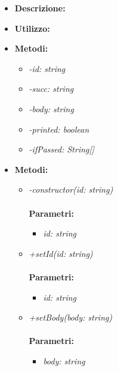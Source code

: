 \begin{itemize}
	\item \textbf{Descrizione:}\\
	
	\item \textbf{Utilizzo:}\\
	
	\item \textbf{Metodi:}
		\begin{itemize}
			\item \emph{-id: string}\\
    		
    		\item \emph{-succ: string}\\
    		
    		\item \emph{-body: string}\\
    		
    		\item \emph{-printed: boolean}\\
    		
    		\item \emph{-ifPassed: String[]}\\
    		
		\end{itemize}
	\item \textbf{Metodi:}
		\begin{itemize}
			\item \emph{-constructor(id: string)}\\
    		\\
    		\textbf{Parametri:}
    		\begin{itemize}
    			\item \emph{id: string}\\
    			
    		\end{itemize}
    		\item \emph{+setId(id: string)}\\
    		\\
    		\textbf{Parametri:}
    		\begin{itemize}
    			\item \emph{id: string}\\
    			
    		\end{itemize}
    		\item \emph{+setBody(body: string)}\\
    		\\
    		\textbf{Parametri:}
    		\begin{itemize}
    			\item \emph{body: string}\\
    			

\end{itemize}
\end{itemize}
\end{itemize}
